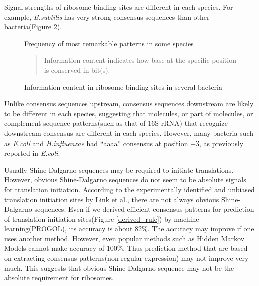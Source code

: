 Signal strengths of ribosome binding sites are different in each
species. For example, {\it B.subtilis} has very strong consensus
sequences than other bacteria\cite{arclabel10,label1502}(Figure
\ref{pro_ic}).  

\begin{figure}
\begin{center}
\end{center}
\caption{Frequency of most remarkable patterns in some species}
\label{bct_coreSD}
\end{figure}

\begin{figure}
\begin{center}
\end{center}
\caption{Information content in ribosome binding sites in several bacteria}
\label{pro_ic}
\begin{small}
\begin{quotation}
Information content indicates how base at the specific position is
conserved in bit(s). 
\end{quotation}
\end{small}
\end{figure}

Unlike consensus sequences upstream, consensus sequences downstream
are likely to be different in each species, suggesting that molecules,
or part of molecules, or complement sequence patterns(such as that of
16S rRNA) that recognize downstream consensus are different in each
species. However, many bacteria such as {\it E.coli} and {\it
H.influenzae} had ``aaaa'' consensus at position +3, as previously
reported in {\it E.coli}\cite{label25}.

Usually Shine-Dalgarno sequences may be required to initiate
translations. However, obvious Shine-Dalgarno sequences do not seem to
be absolute signals for translation initiation. According to the
experimentally identified and unbiased translation initiation sites by
Link et al.\cite{lts14}, there are not always obvious Shine-Dalgarno
sequences. Even if we derived efficient consensus patterns for
prediction of translation initiation sites(Figure
\ref{derived_rule}) by machine learning(PROGOL\cite{label1910,label1939}), its
accuracy is about 82\%. The accuracy may improve if one uses another
method. However, even popular methods such as Hidden Markov Models
cannot make accuracy of 100\%. Thus prediction method that are based
on extracting consensus patterns(non regular expression) may not
improve very much. This suggests that obvious Shine-Dalgarno sequence
may not be the absolute requirement for ribosomes.

